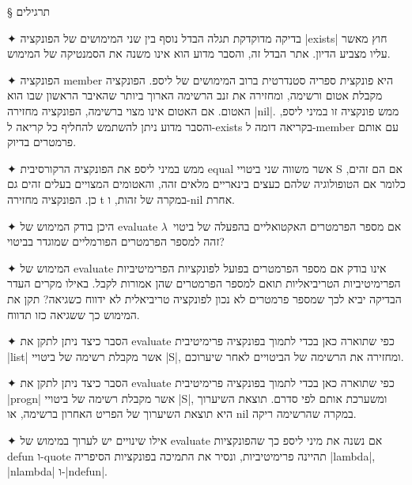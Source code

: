 § תרגילים
\begin{enumerate}
✦ בדיקה מדוקדקת תגלה הבדל נוסף בין שני המימושים של הפונקציה \E|exists| חוץ מאשר
עליו מצביע הדיון. אתר הבדל זה, והסבר מדוע הוא אינו משנה את הסמנטיקה של המימוש.

✦ הפונקציה member היא פונקצית ספריה סטנדרטית ברוב המימושים של ליספ. הפונקציה
מקבלת אטום ורשימה, ומחזירה את זנב הרשימה הארוך ביותר שהאיבר הראשון שבו הוא
האטום. אם האטום אינו מצוי ברשימה, הפונקציה מחזירה \E|nil|. ממש פונקציה זו
במיני ליספ, והסבר מדוע ניתן להשתמש להחליף כל קריאה ל-exists בקריאה דומה
ל-member עם אותם פרמטרים בדיוק.

✦ ממש במיני ליספ את הפונקציה הרקורסיבית equal אשר משווה שני ביטויי S אם הם
זהים, כלומר אם הטופולוגיה שלהם כעצים בינאריים מלאים זהה, והאטומים המצויים בעלים
זהים גם כן. הפונקציה מחזירה t במקרה של זהות, ו-nil אחרת.

✦ היכן בודק המימוש של evaluate אם מספר הפרמטרים האקטואליים בהפעלה של ביטוי~$λ$
זהה למספר הפרמטרים הפורמליים שמוגדר בביטוי?

✦ המימוש של evaluate אינו בודק אם מספר הפרמטרים בפועל לפונקציות הפרימיטיביות
הפרימיטיביות הטריביאליות תואם למספר הפרמטרים שהן אמורות לקבל. באילו מקרים העדר
הבדיקה יביא לכך שמספר פרמטרים לא נכון לפונקציה טריביאלית לא ידווח כשגיאה? תקן
את המימוש כך ששגיאה כזו תדווח.

✦ הסבר כיצד ניתן לתקן את evaluate כפי שתוארה כאן בכדי לתמוך בפונקציה פרימיטיבית
\E|list| אשר מקבלת רשימה של ביטויי \E|S|, ומחזירה את הרשימה של הביטויים לאחר
שיערוכם.

✦ הסבר כיצד ניתן לתקן את evaluate כפי שתוארה כאן בכדי לתמוך בפונקציה פרימיטיבית
\E|progn| אשר מקבלת רשימה של ביטויי \E|S|, ומשערכת אותם לפי סדרם. תוצאת השיערוך
היא תוצאת השיערוך של הפריט האחרון ברשימה, או nil במקרה שהרשימה ריקה.

✦ אילו שינויים יש לערוך במימוש של evaluate אם נשנה את מיני ליספ כך שהפונקציות
defun ו-quote תהיינה פרימיטיביות, ונסיר את התמיכה בפונקציות הסיפריה \E|lambda|,
\E|nlambda| ו-\E|ndefun|.


\end{enumerate}
